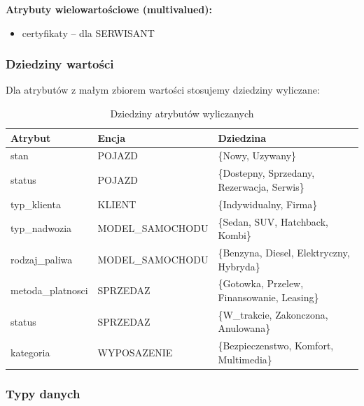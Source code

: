 \documentclass[a4paper,titleauthor]{mwart}
\begin{document}
	\textbf{Atrybuty wielowartościowe (multivalued):}
	\begin{itemize}
		\item certyfikaty -- dla SERWISANT
	\end{itemize}
	
	\subsubsection{Dziedziny wartości}
	
	Dla atrybutów z małym zbiorem wartości stosujemy dziedziny wyliczane:
	
	\begin{table}[H]
		\centering
		\begin{tabular}{|l|l|p{7cm}|}
			\hline
			\textbf{Atrybut} & \textbf{Encja} & \textbf{Dziedzina} \\
			\hline
			stan & POJAZD & \{Nowy, Uzywany\} \\
			\hline
			status & POJAZD & \{Dostepny, Sprzedany, Rezerwacja, Serwis\} \\
			\hline
			typ\_klienta & KLIENT & \{Indywidualny, Firma\} \\
			\hline
			typ\_nadwozia & MODEL\_SAMOCHODU & \{Sedan, SUV, Hatchback, Kombi\} \\
			\hline
			rodzaj\_paliwa & MODEL\_SAMOCHODU & \{Benzyna, Diesel, Elektryczny, Hybryda\} \\
			\hline
			metoda\_platnosci & SPRZEDAZ & \{Gotowka, Przelew, Finansowanie, Leasing\} \\
			\hline
			status & SPRZEDAZ & \{W\_trakcie, Zakonczona, Anulowana\} \\
			\hline
			kategoria & WYPOSAZENIE & \{Bezpieczenstwo, Komfort, Multimedia\} \\
			\hline
		\end{tabular}
		\caption{Dziedziny atrybutów wyliczanych}
	\end{table}
	
	\subsubsection{Typy danych}
	
\end{document}
